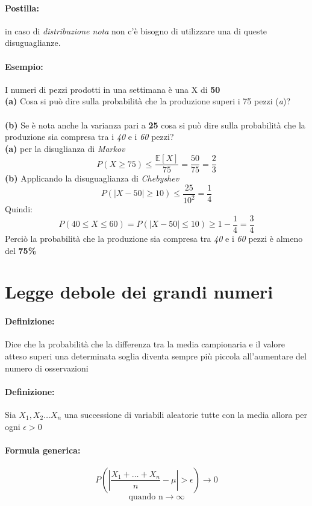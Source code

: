 \documentclass[]{article}
\newcommand{\ev}{\mathbb{E}[X]}
\renewcommand{\ev}[1]{\mathbb{E}[#1]}
\newcommand{\definizione}{\paragraph{Definizione:}}
\newcommand{\formula}{\paragraph{Formula generica:}}
\begin{document}
    \paragraph{Postilla:} in caso di \textit{distribuzione nota} non c'è bisogno di utilizzare una di queste disuguaglianze.

    \paragraph{Esempio:} I numeri di pezzi prodotti in una settimana è una X di \textbf{50} \\
    \textbf{(a)} Cosa si può dire sulla probabilità che la produzione superi i 75 pezzi (\textit{a})? \\ \\
    \textbf{(b)} Se è nota anche la varianza pari a \textbf{25} cosa si può dire sulla probabilità che la produzione sia compresa tra i \textit{40} e i \textit{60} pezzi? \\
    \linebreak[4]
    \textbf{(a)} per la disuglianza di \textit{Markov}
    \[ P(X \geq 75) \leq \frac{\ev{X}}{75} = \frac{50}{75} = \frac{2}{3}\]
    \textbf{(b)} Applicando la disuguaglianza di \textit{Chebyshev}
    \[ P(|X - 50| \geq 10) \leq \frac{25}{10^2} = \frac{1}{4}\]
    Quindi:
    \[ P(40 \leq X \leq 60) = P(|X - 50| \leq 10) \geq 1 - \frac{1}{4} = \frac{3}{4}\]
    Perciò la probabilità che la produzione sia compresa tra \textit{40} e i \textit{60} pezzi è almeno del \textbf{75\%}
    \newpage
    \section{Legge debole dei grandi numeri}
    \definizione Dice che la probabilità che la differenza tra la media campionaria e il valore atteso superi una determinata soglia diventa sempre più piccola all'aumentare del numero di osservazioni
    \definizione Sia $X_1, X_2 \ldots X_n$ una successione di variabili aleatorie tutte con la media \boldsymbol{$\ev{X_i} =: \mu$} allora per ogni $\epsilon > 0$ 
    \formula
    \[ P(|\frac{X_1 + \ldots + X_n}{n} - \mu | > \epsilon) \longrightarrow 0 \] 
    \[ \text{quando n} \longrightarrow \infty \]
\end{document}
